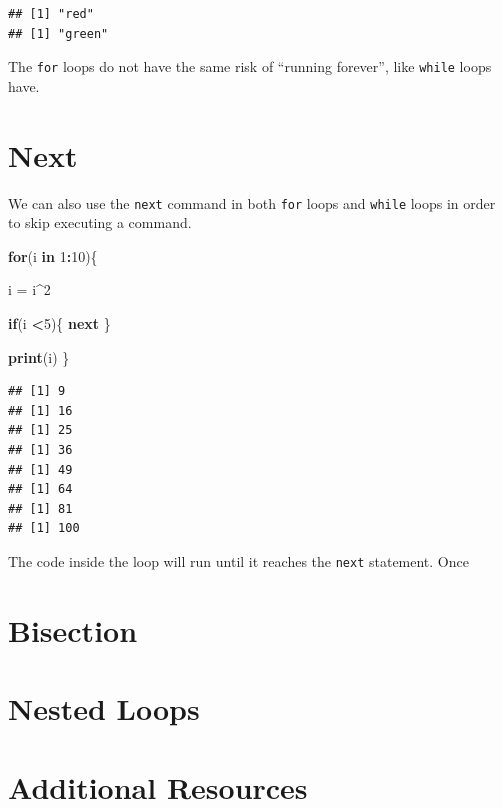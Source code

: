 \documentclass[
]{book}
\newenvironment{Shaded}{\begin{snugshade}}{\end{snugshade}}
\newcommand{\ControlFlowTok}[1]{\textcolor[rgb]{0.13,0.29,0.53}{\textbf{#1}}}
\newcommand{\DecValTok}[1]{\textcolor[rgb]{0.00,0.00,0.81}{#1}}
\newcommand{\KeywordTok}[1]{\textcolor[rgb]{0.13,0.29,0.53}{\textbf{#1}}}
\newcommand{\NormalTok}[1]{#1}
\newcommand{\OperatorTok}[1]{\textcolor[rgb]{0.81,0.36,0.00}{\textbf{#1}}}
\newcommand{\StringTok}[1]{\textcolor[rgb]{0.31,0.60,0.02}{#1}}
\begin{document}
\begin{verbatim}
## [1] "red"
## [1] "green"
\end{verbatim}

The \texttt{for} loops do not have the same risk of ``running forever'', like \texttt{while} loops have.

\hypertarget{next}{%
\section{Next}\label{next}}

We can also use the \texttt{next} command in both \texttt{for} loops and \texttt{while} loops in order to skip executing a command.

\begin{Shaded}
\begin{Highlighting}[]
\ControlFlowTok{for}\NormalTok{(i }\ControlFlowTok{in} \DecValTok{1}\OperatorTok{:}\DecValTok{10}\NormalTok{)\{}
  
\NormalTok{  i =}\StringTok{ }\NormalTok{i}\OperatorTok{^}\DecValTok{2}
  
  \ControlFlowTok{if}\NormalTok{(i }\OperatorTok{<}\DecValTok{5}\NormalTok{)\{}
    \ControlFlowTok{next}
\NormalTok{  \}}
  
  \KeywordTok{print}\NormalTok{(i)}
\NormalTok{\}}
\end{Highlighting}
\end{Shaded}

\begin{verbatim}
## [1] 9
## [1] 16
## [1] 25
## [1] 36
## [1] 49
## [1] 64
## [1] 81
## [1] 100
\end{verbatim}

The code inside the loop will run until it reaches the \texttt{next} statement. Once

\hypertarget{bisection}{%
\section{Bisection}\label{bisection}}

\hypertarget{nested-loops}{%
\section{Nested Loops}\label{nested-loops}}

\hypertarget{additional-resources-4}{%
\section{Additional Resources}\label{additional-resources-4}}
\end{document}
